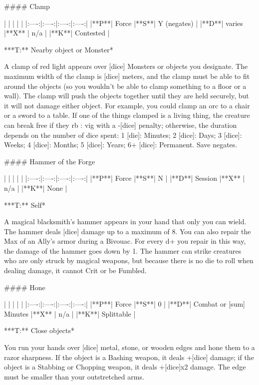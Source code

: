 #### Clamp

| | | | |
|:----:|:----:|:----:|:----:|
|**P**| Force |**S**|  Y (negates) |
|**D**| varies |**X** |  n/a  |
|**K**| Contested |


***T:**   Nearby object or Monster*



A clamp of red light appears over [dice] Monsters or objects you designate. The maximum width of the clamp is [dice] meters, and the clamp must be able to fit around the objects (so you wouldn't be able to clamp something to a floor or a wall).  The clamp will push the objects together until they are held securely, but it will not damage either object.  For example, you could clamp an orc to a chair or a sword to a table.  If one of the things clamped is a living thing, the creature can break free if they {rb} : {vig} with a -[dice] penalty; otherwise, the duration depends on the number of dice spent:  1 [die]: Minutes; 2 [dice]: Days; 3 [dice]: Weeks; 4 [dice]: Months; 5 [dice]: Years; 6+ [dice]: Permanent.  Save negates.




#### Hammer of the Forge

| | | | |
|:----:|:----:|:----:|:----:|
|**P**| Force |**S**|  N |
|**D**| Session |**X** |  n/a  |
|**K**| None |


***T:**   Self*



A magical blacksmith's hammer appears in your hand that only you can wield.  The hammer deals [dice] damage up to a maximum of 8.  You can also repair the Max \UD of an Ally's armor during a Bivouac.  For every {d+} you repair in this way, the damage of the hammer goes down by 1.  The hammer can strike creatures who are only struck by magical weapons, but because there is no die to roll when dealing damage, it cannot Crit or be Fumbled.





#### Hone

| | | | |
|:----:|:----:|:----:|:----:|
|**P**| Force |**S**|  0 |
|**D**| Combat or [sum] Minutes |**X** |  n/a  |
|**K**| Splittable |


***T:**   Close objects*



You run your hands over [dice] metal, stone, or wooden edges and hone them to a razor sharpness. If the object is a Bashing weapon, it deals +[dice] damage; if the object is a Stabbing or Chopping weapon, it deals +[dice]x2 damage. The edge must be smaller than your outstretched arms.




